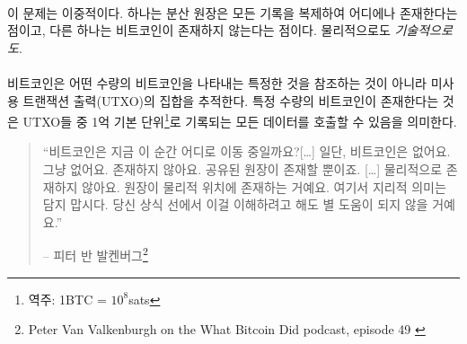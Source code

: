 \paragraph{}
이 문제는 이중적이다. 하나는 분산 원장은 모든 기록을 복제하여 어디에나 존재한다는 점이고, 다른 하나는 비트코인이 존재하지 않는다는 점이다. 
물리적으로도 \textit{기술적으로도}.

\paragraph{}
비트코인은 어떤 수량의 비트코인을 나타내는 특정한 것을 참조하는 것이 아니라 미사용 트랜잭션 출력(UTXO)의 집합을 추적한다.
특정 수량의 비트코인이 존재한다는 것은 UTXO들 중 1억 기본 단위\footnote{역주: 1BTC = $10^{8}$sats}로 기록되는 모든 데이터를 호출할 수 있음을 의미한다. 

\begin{quotation}\begin{samepage}
		\enquote{비트코인은 지금 이 순간 어디로 이동 중일까요?[\ldots] 일단, 비트코인은
			없어요. 그냥 없어요. 존재하지 않아요. 공유된 원장이 존재할 뿐이죠. [\ldots] 
			물리적으로 존재하지 않아요. 원장이 물리적 위치에 존재하는 거예요.
			여기서 지리적 의미는 담지 맙시다. 당신 상식 선에서 이걸 이해하려고 해도 별 도움이 되지 않을 거예요.}
		\begin{flushright} -- 피터 반 발켄버그\footnote{Peter Van Valkenburgh on the What Bitcoin Did podcast, episode 49 \cite{wbd049}}
\end{flushright}\end{samepage}\end{quotation}

